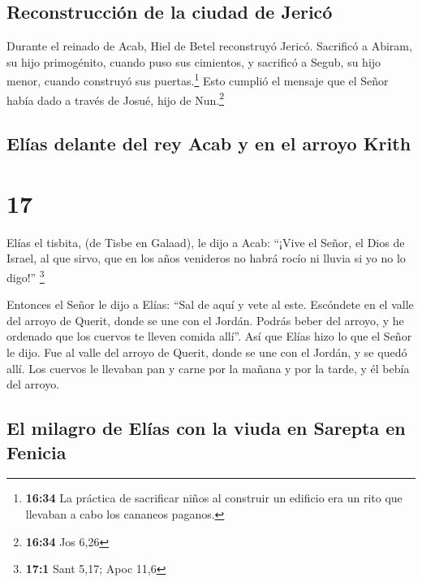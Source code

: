 \hypertarget{reconstrucciuxf3n-de-la-ciudad-de-jericuxf3}{%
\subsection{Reconstrucción de la ciudad de
Jericó}\label{reconstrucciuxf3n-de-la-ciudad-de-jericuxf3}}

 Durante el reinado de Acab, Hiel de Betel reconstruyó
Jericó. Sacrificó a Abiram, su hijo primogénito, cuando puso sus
cimientos, y sacrificó a Segub, su hijo menor, cuando construyó sus
puertas.\footnote{\textbf{16:34} La práctica de sacrificar niños al
  construir un edificio era un rito que llevaban a cabo los cananeos
  paganos.} Esto cumplió el mensaje que el Señor había dado a través de
Josué, hijo de Nun.\footnote{\textbf{16:34} Jos 6,26}

\hypertarget{eluxedas-delante-del-rey-acab-y-en-el-arroyo-krith}{%
\subsection{Elías delante del rey Acab y en el arroyo
Krith}\label{eluxedas-delante-del-rey-acab-y-en-el-arroyo-krith}}

\hypertarget{section-16}{%
\section{17}\label{section-16}}

 Elías el tisbita, (de Tisbe en Galaad), le dijo a Acab:
``¡Vive el Señor, el Dios de Israel, al que sirvo, que en los años
venideros no habrá rocío ni lluvia si yo no lo digo!'' \footnote{\textbf{17:1}
  Sant 5,17; Apoc 11,6}

 Entonces el Señor le dijo a Elías:  ``Sal
de aquí y vete al este. Escóndete en el valle del arroyo de Querit,
donde se une con el Jordán.  Podrás beber del arroyo, y he
ordenado que los cuervos te lleven comida allí''.  Así que
Elías hizo lo que el Señor le dijo. Fue al valle del arroyo de Querit,
donde se une con el Jordán, y se quedó allí.  Los cuervos
le llevaban pan y carne por la mañana y por la tarde, y él bebía del
arroyo.

\hypertarget{el-milagro-de-eluxedas-con-la-viuda-en-sarepta-en-fenicia}{%
\subsection{El milagro de Elías con la viuda en Sarepta en
Fenicia}\label{el-milagro-de-eluxedas-con-la-viuda-en-sarepta-en-fenicia}}

